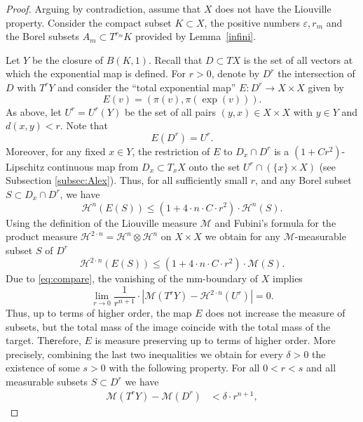 \documentclass[12pt,leqno,intlimits]{amsart}
\numberwithin{equation}{section}
\theoremstyle{definition}
\theoremstyle{remark}
\newcommand{\lref}[1]{Lemma~\ref{#1}}
\def\:{\colon}
\begin{document}
\begin{proof}
Arguing by contradiction, assume that $X$ does not have the Liouville property.
Consider the compact subset $K \subset X$, the positive numbers $\varepsilon, r_m$ and the Borel
subsets $A_m\subset T^{r_m} K$ provided by \lref{infini}.

Let $Y$ be the closure of $B (K,1)$.
Recall that $D\subset TX$ is the set of all vectors at which the exponential map is defined.
For $r>0$, denote by $D^r$ the intersection of $D$ with $T^r Y$ and consider the ``total exponential map''
$E\:D^r \to X\times X$ given by
$$E(v)= (\pi (v), \pi (\exp (v))).$$
As above, let $U^r =U^r(Y)$ be the set of all
pairs $(y,x) \in X\times X$ with $y\in Y$ and $d(x,y)<r$.
Note that
\begin{equation} \label{eq:image}
E(D^r) =U^r.
\end{equation}
Moreover, for any fixed $x \in Y$, the restriction of $E$ to $D_x \cap D^r$ is
a $(1+ C r^2)$-Lipschitz continuous map from $D_x\subset T_xX$ onto the set $U^r \cap (\{x \} \times X)$ (see Subsection \ref{subsec:Alex}).
Thus, for all sufficiently small $r$, and any Borel subset $S\subset D_x \cap D^r$, we have
$$\mathcal H^n (E(S)) \leq (1+4{\cdot} n{\cdot}  C{\cdot}  r^2)\cdot \mathcal H^n (S).$$
Using the definition of the Liouville measure $\mathcal M$ and Fubini's formula for the product measure
$\mathcal H^{2\cdot n} =\mathcal H^n \otimes \mathcal H^n $ on $X\times X$ we obtain for any $\mathcal M$-measurable subset $S$ of $D^r$
\begin{equation} \label{eq:contract}
\mathcal H^{2\cdot n} (E(S)) \leq (1+4{\cdot} n{\cdot} C{\cdot}  r^2) \cdot \mathcal M(S).
\end{equation}
Due to \eqref{eq:compare}, the vanishing  of the mm-boundary of $X$ implies
$$\lim _{r\to 0} \frac 1 {r^{n+1} }\cdot |\mathcal M(T^{r} Y) -\mathcal H^{2\cdot n} (U^r)| =0.$$
Thus, up to terms of higher order, the map $E$ does not increase the measure of subsets, but the total mass of the image
coincide with the total mass of the target.
Thеrefore, $E$ is measure preserving up to terms of higher order.
More precisely, combining the last two inequalities we obtain for every $\delta >0$ the existence of some $s>0$ with the following property. For all $0<r<s$ and all measurable subsets $S\subset D^r$
we have
\begin{equation} \label{eq:almostall}
\begin{aligned}
 \mathcal M (T^r Y)- \mathcal M (D^r) &< \delta{\cdot}r^{n+1},

\end{aligned}
\end{equation}
\end{proof}
\end{document}
